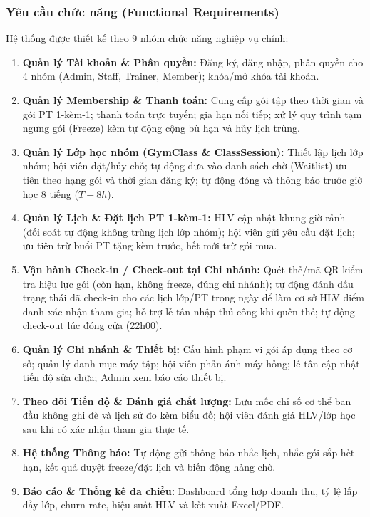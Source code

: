 \documentclass[a4paper,12pt]{article}
\begin{document}
\subsubsection{Yêu cầu chức năng (Functional Requirements)}
Hệ thống được thiết kế theo 9 nhóm chức năng nghiệp vụ chính:
\begin{enumerate}
    \item \textbf{Quản lý Tài khoản \& Phân quyền:} Đăng ký, đăng nhập, phân quyền cho 4 nhóm (Admin, Staff, Trainer, Member); khóa/mở khóa tài khoản.
    \item \textbf{Quản lý Membership \& Thanh toán:} Cung cấp gói tập theo thời gian và gói PT 1-kèm-1; thanh toán trực tuyến; gia hạn nối tiếp; xử lý quy trình tạm ngưng gói (Freeze) kèm tự động cộng bù hạn và hủy lịch trùng.
    \item \textbf{Quản lý Lớp học nhóm (GymClass \& ClassSession):} Thiết lập lịch lớp nhóm; hội viên đặt/hủy chỗ; tự động đưa vào danh sách chờ (Waitlist) ưu tiên theo hạng gói và thời gian đăng ký; tự động đóng và thông báo trước giờ học 8 tiếng ($T-8h$).
    \item \textbf{Quản lý Lịch \& Đặt lịch PT 1-kèm-1:} HLV cập nhật khung giờ rảnh (đối soát tự động không trùng lịch lớp nhóm); hội viên gửi yêu cầu đặt lịch; ưu tiên trừ buổi PT tặng kèm trước, hết mới trừ gói mua.
    \item \textbf{Vận hành Check-in / Check-out tại Chi nhánh:} Quét thẻ/mã QR kiểm tra hiệu lực gói (còn hạn, không freeze, đúng chi nhánh); tự động đánh dấu trạng thái đã check-in cho các lịch lớp/PT trong ngày để làm cơ sở HLV điểm danh xác nhận tham gia; hỗ trợ lễ tân nhập thủ công khi quên thẻ; tự động check-out lúc đóng cửa (22h00).
    \item \textbf{Quản lý Chi nhánh \& Thiết bị:} Cấu hình phạm vi gói áp dụng theo cơ sở; quản lý danh mục máy tập; hội viên phản ánh máy hỏng; lễ tân cập nhật tiến độ sửa chữa; Admin xem báo cáo thiết bị.
    \item \textbf{Theo dõi Tiến độ \& Đánh giá chất lượng:} Lưu mốc chỉ số cơ thể ban đầu không ghi đè và lịch sử đo kèm biểu đồ; hội viên đánh giá HLV/lớp học sau khi có xác nhận tham gia thực tế.
    \item \textbf{Hệ thống Thông báo:} Tự động gửi thông báo nhắc lịch, nhắc gói sắp hết hạn, kết quả duyệt freeze/đặt lịch và biến động hàng chờ.
    \item \textbf{Báo cáo \& Thống kê đa chiều:} Dashboard tổng hợp doanh thu, tỷ lệ lấp đầy lớp, churn rate, hiệu suất HLV và kết xuất Excel/PDF.
\end{enumerate}
\end{document}
